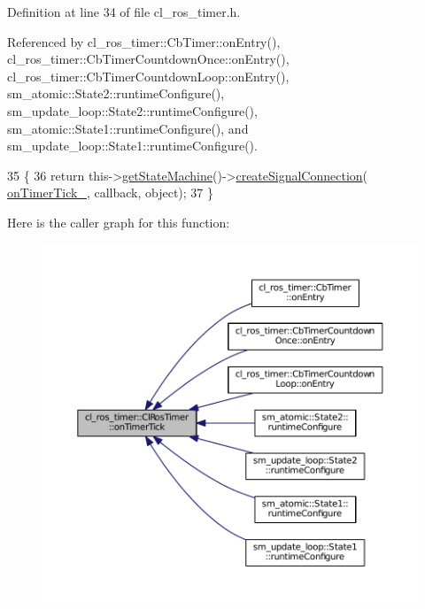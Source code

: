 Definition at line 34 of file cl\+\_\+ros\+\_\+timer.\+h.



Referenced by cl\+\_\+ros\+\_\+timer\+::\+Cb\+Timer\+::on\+Entry(), cl\+\_\+ros\+\_\+timer\+::\+Cb\+Timer\+Countdown\+Once\+::on\+Entry(), cl\+\_\+ros\+\_\+timer\+::\+Cb\+Timer\+Countdown\+Loop\+::on\+Entry(), sm\+\_\+atomic\+::\+State2\+::runtime\+Configure(), sm\+\_\+update\+\_\+loop\+::\+State2\+::runtime\+Configure(), sm\+\_\+atomic\+::\+State1\+::runtime\+Configure(), and sm\+\_\+update\+\_\+loop\+::\+State1\+::runtime\+Configure().


\begin{DoxyCode}
35     \{
36         \textcolor{keywordflow}{return} this->\hyperlink{classsmacc_1_1ISmaccClient_aec51d4712404cb9882b86e4c854bb93a}{getStateMachine}()->\hyperlink{classsmacc_1_1ISmaccStateMachine_adf0f42ade0c65cc471960fe2a7c42da2}{createSignalConnection}(
      \hyperlink{classcl__ros__timer_1_1ClRosTimer_a2fcaab287b6ee13f6cc689876c6d28fa}{onTimerTick\_}, callback, \textcolor{keywordtype}{object});
37     \}
\end{DoxyCode}


Here is the caller graph for this function\+:
\nopagebreak
\begin{figure}[H]
\begin{center}
\leavevmode
\includegraphics[width=350pt]{classcl__ros__timer_1_1ClRosTimer_a7edcc057bfb5a25fe0892755137dd8da_icgraph}
\end{center}
\end{figure}


